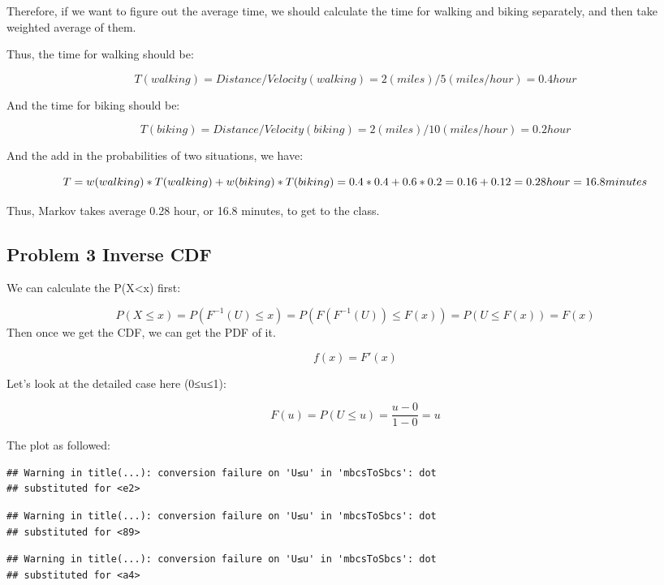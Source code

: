 \documentclass[
]{article}
\begin{document}
Therefore, if we want to figure out the average time, we should calculate the time for walking and biking separately, and then take weighted average of them.

Thus, the time for walking should be:

\[
T(walking) = Distance/Velocity(walking) =2(miles)/5(miles/hour) = 0.4 hour
\]

And the time for biking should be:

\[
T(biking) = Distance/Velocity(biking) =2(miles)/10(miles/hour) = 0.2 hour
\]

And the add in the probabilities of two situations, we have:

\[
T = w(walking)*T(walking) + w(biking)*T(biking) \\= 0.4*0.4 + 0.6*0.2 = 0.16 +0.12 = 0.28 hour = 16.8 minutes
\]

Thus, Markov takes average 0.28 hour, or 16.8 minutes, to get to the class.

\hypertarget{problem-3-inverse-cdf}{%
\subsection{Problem 3 Inverse CDF}\label{problem-3-inverse-cdf}}

We can calculate the P(X\textless x) first:

\[
P(X≤x) = P(F^{-1}(U)≤x) = P(F(F^{-1}(U))≤F(x)) = P(U≤F(x)) = F(x)
\]
Then once we get the CDF, we can get the PDF of it.

\[
f(x) = F'(x) 
\]

Let's look at the detailed case here (0≤u≤1):

\[
F(u) = P(U≤u) = \frac {u-0}{1-0} = u
\]

The plot as followed:

\begin{verbatim}
## Warning in title(...): conversion failure on 'U≤u' in 'mbcsToSbcs': dot
## substituted for <e2>
\end{verbatim}

\begin{verbatim}
## Warning in title(...): conversion failure on 'U≤u' in 'mbcsToSbcs': dot
## substituted for <89>
\end{verbatim}

\begin{verbatim}
## Warning in title(...): conversion failure on 'U≤u' in 'mbcsToSbcs': dot
## substituted for <a4>
\end{verbatim}
\end{document}

